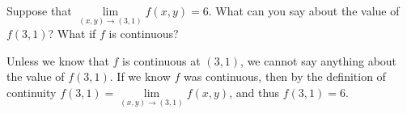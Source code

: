 \begin{exercise}
	Suppose that $\lim\limits_{\left( x, y \right) \to \left( 3, 1 \right)} f\left(x,y\right) = 6$. What can you say about the value of $f\left(3,1\right)$? What if $f$ is continuous?
\end{exercise}
\begin{solution}
	Unless we know that $f$ is continuous at $\left( 3, 1 \right)$, we cannot say anything about the value of $f\left(3,1\right)$. If we know $f$ was continuous, then by the definition of continuity $f\left(3,1\right) = \lim\limits_{\left(x,y\right) \to \left(3,1\right)} f\left(x,y\right)$, and thus $f\left(3,1\right) = 6$.
\end{solution}
